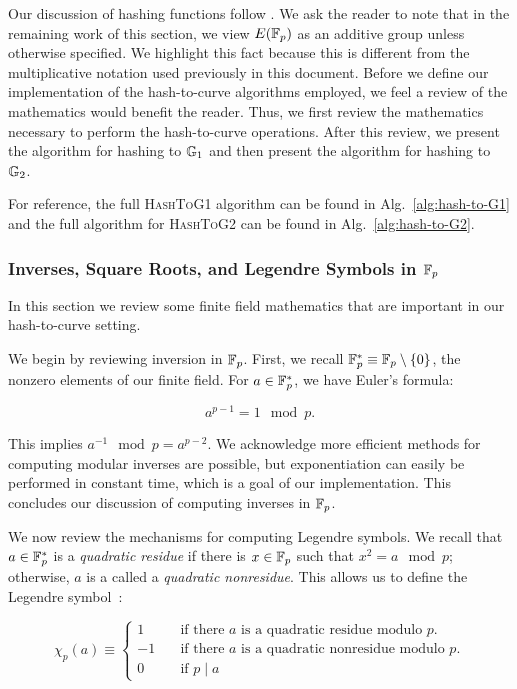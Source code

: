 Our discussion of hashing functions follow
\cite{ft2012bnhashtocurve,boneh2019h2cBLS12}.
We ask the reader to note that in the remaining work of this section,
we view $E(\mathbb{F}_{p})$ as an additive group unless otherwise specified.
We highlight this fact because this is different from the multiplicative
notation used previously in this document.
Before we define our implementation of the hash-to-curve algorithms employed,
we feel a review of the mathematics would benefit the reader.
Thus, we first
review the mathematics necessary to perform the hash-to-curve operations.
After this review, we present the algorithm for hashing to $\mathbb{G}_{1}$
and then present the algorithm for hashing to $\mathbb{G}_{2}$.

For reference, the full \textsc{HashToG1} algorithm can be
found in Alg.~\ref{alg:hash-to-G1} and the full algorithm for \textsc{HashToG2}
can be found in Alg.~\ref{alg:hash-to-G2}.



\subsubsection{Inverses, Square Roots, and Legendre Symbols
    in $\mathbb{F}_{p}$}
\label{sssec:finite_math_Fp}

In this section we review some finite field mathematics that are
important in our hash-to-curve setting.

We begin by reviewing inversion in $\mathbb{F}_{p}$.
First, we recall $\mathbb{F}_{p}^{*} \equiv \mathbb{F}_{p}\setminus\left\{ 0 \right\}$,
the nonzero elements of our finite field.
For $a\in\mathbb{F}_{p}^{*}$, we have Euler's formula:

\begin{equation}
    a^{p-1} = 1 \mod p.
\end{equation}

\noindent
This implies $a^{-1} \mod p = a^{p-2}$.
We acknowledge more efficient methods for computing modular inverses are
possible, but exponentiation can easily be performed in constant time, which
is a goal of our implementation. This concludes our discussion of computing
inverses in $\mathbb{F}_{p}$.

We now review the mechanisms for
computing Legendre symbols.
We recall that $a\in\mathbb{F}_{p}^{*}$ is a \emph{quadratic residue}
if there is $x\in\mathbb{F}_{p}$ such that $x^{2} = a \mod p$;
otherwise, $a$ is a called a \emph{quadratic nonresidue}.
This allows us to define the Legendre symbol~\cite{imc2008}:

\begin{equation}
    \chi_{p}(a) \equiv \begin{cases}
        1 \quad& \text{if there $a$ is a quadratic residue modulo $p$.} \\
        -1 \quad& \text{if there $a$ is a quadratic nonresidue modulo $p$.} \\
        0 \quad& \text{if $p \mid a$}
    \end{cases}
\end{equation}

